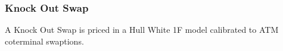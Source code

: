 \subsubsection{Knock Out Swap}
\label{pricing::knock_out_swap}

A Knock Out Swap is priced in a Hull White 1F model calibrated to ATM coterminal swaptions.
